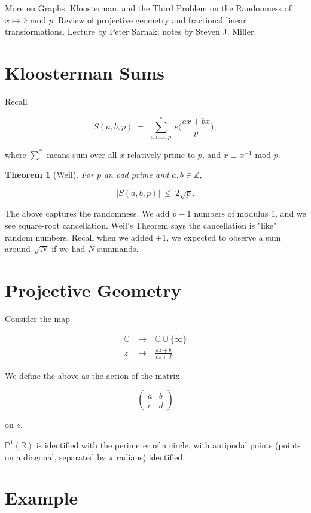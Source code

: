 \documentclass[12pt,letterpaper]{report}
\newcommand\be{\begin{equation}}
\newcommand\ee{\end{equation}}
\newcommand\bea{\begin{eqnarray}}
\newcommand\eea{\end{eqnarray}}
\newcommand{\Pone}{\ensuremath{\mathbb{P}^1}}
\newcommand{\R}{\ensuremath{\mathbb{R}}}
\newcommand{\C}{\ensuremath{\mathbb{C}}}
\newcommand{\Z}{\ensuremath{\mathbb{Z}}}
\newtheorem{thm}{Theorem}[section]
\begin{document}
More on Graphs, Kloosterman, and the Third Problem on the
Randomness of $x \mapsto \overline{x}$ mod $p$. Review of
projective geometry and fractional linear transformations. Lecture
by Peter Sarnak; notes by Steven J. Miller.


\section{Kloosterman Sums}

Recall

\be S(a,b,p) \ = \ \ \sum_{x \ \text{mod} \ p}^* \  e\Big(
\frac{ax + b\overline{x}}{p} \Big), \ee

where $\sum^*$ means sum over all $x$ relatively prime to $p$, and
$\overline{x} \equiv x^{-1}$ mod $p$.

\begin{thm}[Weil] For $p$ an odd prime and $a,b \in \Z$,

\be |S(a,b,p)| \ \le \ 2 \sqrt{p}. \ee
\end{thm}

The above captures the randomness. We add $p-1$ numbers of modulus
$1$, and we see square-root cancellation. Weil's Theorem says the
cancellation is "like" random numbers. Recall when we added $\pm
1$, we expected to observe a sum around $\sqrt{N}$ if we had $N$
summands.

\section{Projective Geometry}

Consider the map

\bea \C & \ \to \ &  \C \cup \{\infty\} \nonumber\\   z & \
\mapsto \ & \frac{az + b}{cz+d}. \eea

We define the above as the action of the matrix

\be  \left(\begin{array}{cc}
                        a &  b  \\
                        c   & d
                          \end{array}\right)
\ee

on $z$.


$\Pone(\R)$ is identified with the perimeter of a circle, with
antipodal points (points on a diagonal, separated by $\pi$
radians) identified.



\section{Example}
\end{document}
